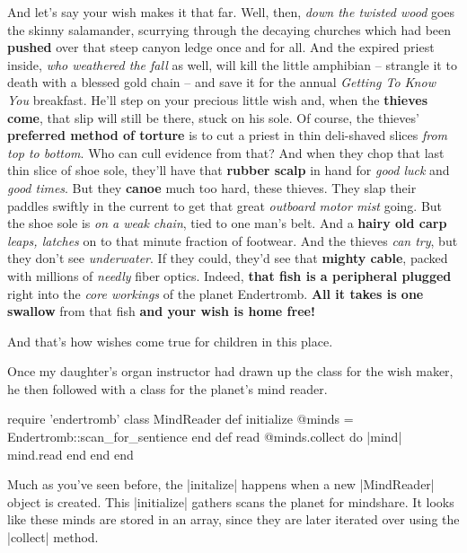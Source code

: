 \documentclass[12pt,twoside]{report}
\begin{document}
And let's say your wish makes it that far.  Well, then, {\em down the
  twisted wood} goes the skinny salamander, scurrying through the
decaying churches which had been {\bf pushed} over that steep canyon
ledge once and for all.  And the expired priest inside, {\em who
  weathered the fall} as well, will kill the little amphibian --
strangle it to death with a blessed gold chain -- and save it for the
annual {\em Getting To Know You} breakfast.  He'll step on your
precious little wish and, when the {\bf thieves come}, that slip will
still be there, stuck on his sole.  Of course, the thieves' {\bf
  preferred method of torture} is to cut a priest in thin deli-shaved
slices {\em from top to bottom}.  Who can cull evidence from that?
And when they chop that last thin slice of shoe sole, they'll have
that {\bf rubber scalp} in hand for {\em good luck} and {\em good
  times}. But they {\bf canoe} much too hard, these thieves.  They
slap their paddles swiftly in the current to get that great {\em
  outboard motor mist} going.  But the shoe sole is {\em on a weak
  chain}, tied to one man's belt.  And a {\bf hairy old carp} {\em
  leaps, latches} on to that minute fraction of footwear.  And the
thieves {\em can try}, but they don't see {\em underwater}.  If they
could, they'd see that {\bf mighty cable}, packed with millions of
{\em needly} fiber optics.  Indeed, {\bf that fish is a peripheral
  plugged} right into the {\em core workings} of the planet
Endertromb.  {\bf All it takes is one swallow} from that fish {\bf and
  your wish is home free!}

And that's how wishes come true for children in this place.

Once my daughter's organ instructor had drawn up the class for the
wish maker, he then followed with a class for the planet's mind
reader.


\begin{rubycode}

 require 'endertromb'
 class MindReader
   def initialize
     @minds = Endertromb::scan_for_sentience
   end
   def read
     @minds.collect do |mind|
        mind.read
     end
   end
 end

\end{rubycode}


Much as you've seen before, the \rubyinline|initalize|
happens when a new \rubyinline|MindReader| object is
created. This \rubyinline|initialize| gathers scans
the planet for mindshare.  It looks like these minds are stored in an
array, since they are later iterated over using the
\rubyinline|collect| method.
\end{document}
